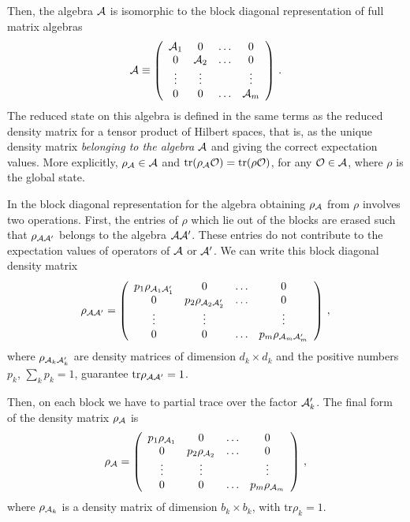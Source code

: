 \documentclass[12pt,a4paper]{article}
\begin{document}
Then, the algebra ${\cal A}$ is isomorphic to the block diagonal representation of full matrix algebras
\begin{equation}
{\cal A}\equiv 
\left(\begin{array}{cccc}
{\cal A}_1 & 0 & \hdots & 0 \\
0 & {\cal A}_2 & \hdots & 0 \\
\vdots & \vdots & &\vdots \\
0 & 0 & \hdots & {\cal A}_m 
\end{array}\right)\,.
\end{equation}
The reduced state on this algebra is defined in the same terms as the reduced density matrix for a tensor product of Hilbert spaces, 
that is, as the unique density matrix {\sl belonging to the algebra} ${\cal A}$ and giving the correct expectation values. More 
explicitly, $\rho_{\cal A}\in {\cal A}$ and $\textrm{tr}(\rho_{\cal A} {\cal O})=\textrm{tr} (\rho {\cal O} )$, for any ${\cal O}\in {\cal A}$, 
where $\rho$ is the global state. 

In the block diagonal representation for the algebra obtaining $\rho_{\cal A}$ from $\rho$ involves two operations. First, the entries of $\rho$ 
which lie out of the blocks are erased such that $\rho_{{\cal A}{\cal A}^\prime}$ belongs to the algebra ${\cal A}{\cal A}^\prime$. These entries do not contribute to the expectation values of operators of ${\cal A}$ or ${\cal A}^\prime$. 
We can write this block diagonal density matrix 
\begin{equation}
\rho_{{\cal A}{\cal A}^\prime}= 
\left(\begin{array}{cccc}
p_1 \rho_{{\cal A}_1{\cal A}_1^\prime} & 0 & \hdots & 0 \\
0 & p_2 \rho_{{\cal A}_2{\cal A}_2^\prime} & \hdots & 0 \\
\vdots & \vdots & &\vdots \\
0 & 0 & \hdots & p_m \rho_{{\cal A}_m{\cal A}_m^\prime} 
\end{array}\right)\,,\label{dua}
\end{equation}
 where $\rho_{{\cal A}_k{\cal A}_k^\prime}$ are density matrices of dimension $d_k\times d_k$ and the positive numbers $p_k$, $\sum_k p_k=1$,    
 guarantee $\textrm{tr}\rho_{{\cal A}{\cal A}^\prime}=1$.
 
 Then, on each block we have to partial trace over the factor ${\cal A}_k^\prime$. The final form of the density matrix $\rho_{\cal A}$ is
\begin{equation}
\rho_{\cal A}= 
\left(\begin{array}{cccc}
p_1 \rho_{{\cal A}_1} & 0 & \hdots & 0 \\
0 & p_2 \rho_{{\cal A}_2} & \hdots & 0 \\
\vdots & \vdots & &\vdots \\
0 & 0 & \hdots & p_m \rho_{{\cal A}_m} 
\end{array}\right)\,,\label{explicit}
\end{equation}
where $\rho_{{\cal A}_k}$ is a density matrix of dimension $b_k\times b_k$, with $\textrm{tr}\rho_k=1$.
\end{document}
